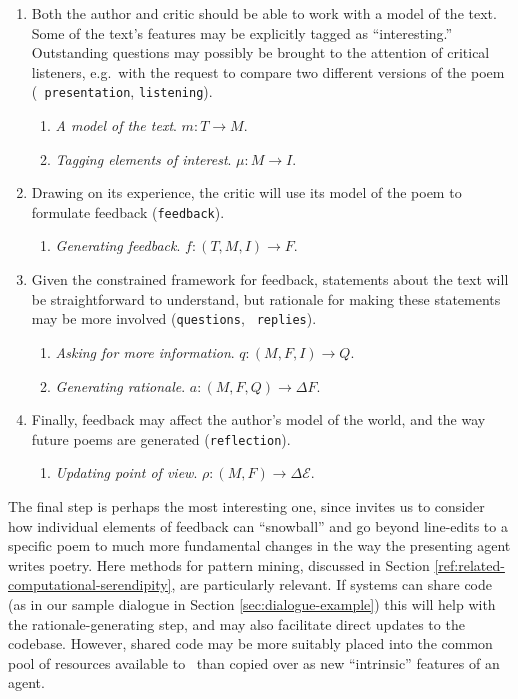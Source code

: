 \begin{enumerate}[label=\Roman*.]
\item Both the author and critic should be able to work with a model
  of the text.  Some of the text's features may be explicitly tagged
  as ``interesting.''  Outstanding questions may possibly be
  brought to the attention of critical listeners, e.g.~with the
  request to compare two different versions of the poem ({\tt
    presentation}, {\tt listening}).
\begin{enumerate}[label=\arabic*.]
\item \emph{A model of the text}. $m: T\rightarrow M$.
\item \emph{Tagging elements of interest}. $\mu: M\rightarrow I$.
\end{enumerate}
\item Drawing on its experience, the critic will use its model of the
  poem to formulate feedback ({\tt feedback}).
\begin{enumerate}[label=\arabic*.]
\item \emph{Generating feedback}. $f: (T,M,I)\rightarrow F$.
\end{enumerate}
\item Given the constrained framework for feedback, statements about
  the text will be straightforward to understand, but rationale for
  making these statements may be more involved ({\tt questions}, {\tt
    replies}).
\begin{enumerate}[label=\arabic*.]
\item \emph{Asking for more information}. $q: (M,F,I) \rightarrow Q$.
\item \emph{Generating rationale}. $a: (M,F,Q) \rightarrow \Delta F$.
\end{enumerate}
\item Finally, feedback may affect the author's model of the world, and the way future poems are generated ({\tt reflection}).
\begin{enumerate}[label=\arabic*.]
\item \emph{Updating point of view}. $\rho: (M,F) \rightarrow \Delta\mathcal{E}$.
\end{enumerate}
\end{enumerate}

The final step is perhaps the most interesting one, since invites us
to consider how individual elements of feedback can ``snowball'' and
go beyond line-edits to a specific poem to much more fundamental
changes in the way the presenting agent writes poetry.  Here methods
for pattern mining, discussed in Section
\ref{ref:related-computational-serendipity}, are particularly relevant.
If systems can share code (as in our sample dialogue in Section
\ref{sec:dialogue-example}) this will help with the
rationale-generating step, and may also facilitate direct updates to
the codebase.  However, shared code may be more suitably placed into
the common pool of resources available to \Fw\ than copied over as
new ``intrinsic'' features of an agent.

